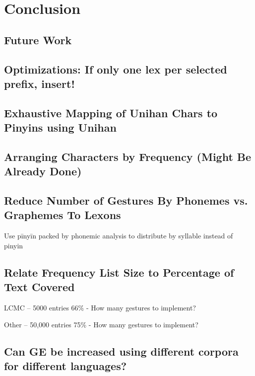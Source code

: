 \chapter{Conclusion}\label{conclusion}

\section{Future Work}\label{future-work}
\section{Optimizations: If only one lex per selected prefix,
insert!}\label{optimizations-if-only-one-lex-per-selected-prefix-insert}

\section{Exhaustive Mapping of Unihan Chars to Pinyins using
Unihan}\label{exhaustive-mapping-of-unihan-chars-to-pinyins-using-unihan}

\section{Arranging Characters by Frequency (Might Be Already
Done)}\label{arranging-characters-by-frequency-might-be-already-done}

\section{Reduce Number of Gestures By Phonemes vs. Graphemes To
Lexons}\label{reduce-number-of-gestures-by-phonemes-vs.-graphemes-to-lexons}

Use pīnyīn packed by phonemic analysis to distribute by syllable instead
of pinyin

\section{Relate Frequency List Size to Percentage of Text
Covered}\label{relate-frequency-list-size-to-percentage-of-text-covered}

LCMC -- 5000 entries 66\% - How many gestures to implement?

Other -- 50,000 entries 75\% - How many gestures to implement?

\section{Can GE be increased using different corpora for different
languages?}\label{can-ge-be-increased-using-different-corpora-for-different-languages}


